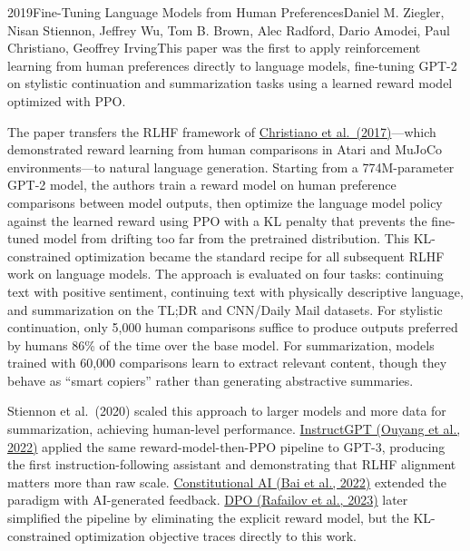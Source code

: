 
\begin{papersummary}{2019}{Fine-Tuning Language Models from Human Preferences}{Daniel M. Ziegler, Nisan Stiennon, Jeffrey Wu, Tom B. Brown, Alec Radford, Dario Amodei, Paul Christiano, Geoffrey Irving}{This paper was the first to apply reinforcement learning from human preferences directly to language models, fine-tuning GPT-2 on stylistic continuation and summarization tasks using a learned reward model optimized with PPO.}

The paper transfers the RLHF framework of \hyperref[paper:christiano-2017-rlhf]{Christiano et al.\ (2017)}---which demonstrated reward learning from human comparisons in Atari and MuJoCo environments---to natural language generation. Starting from a 774M-parameter GPT-2 model, the authors train a reward model on human preference comparisons between model outputs, then optimize the language model policy against the learned reward using PPO with a KL penalty that prevents the fine-tuned model from drifting too far from the pretrained distribution. This KL-constrained optimization became the standard recipe for all subsequent RLHF work on language models. The approach is evaluated on four tasks: continuing text with positive sentiment, continuing text with physically descriptive language, and summarization on the TL;DR and CNN/Daily Mail datasets. For stylistic continuation, only 5,000 human comparisons suffice to produce outputs preferred by humans 86\% of the time over the base model. For summarization, models trained with 60,000 comparisons learn to extract relevant content, though they behave as ``smart copiers'' rather than generating abstractive summaries.

Stiennon et al.\ (2020) scaled this approach to larger models and more data for summarization, achieving human-level performance. \hyperref[paper:ouyang-2022]{InstructGPT (Ouyang et al., 2022)} applied the same reward-model-then-PPO pipeline to GPT-3, producing the first instruction-following assistant and demonstrating that RLHF alignment matters more than raw scale. \hyperref[paper:bai-2022]{Constitutional AI (Bai et al., 2022)} extended the paradigm with AI-generated feedback. \hyperref[paper:rafailov-2023-dpo]{DPO (Rafailov et al., 2023)} later simplified the pipeline by eliminating the explicit reward model, but the KL-constrained optimization objective traces directly to this work.


\end{papersummary}
